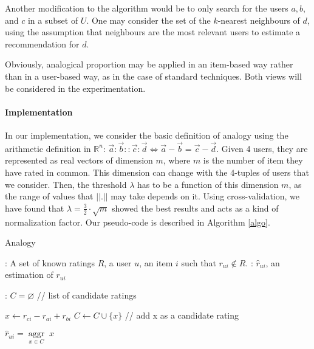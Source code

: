 \documentclass{llncs}
\newcommand{\aggr}[1]{\underset{#1}{\operatorname{aggr}}\;}
\begin{document}
Another modification to the algorithm would be to only search for the users
$a, b,$ and $c$ in a subset of $U$. One may consider the set of the $k$-nearest
neighbours of $d$, using the assumption that neighbours are the most relevant
users to estimate a recommendation for $d$.

Obviously, analogical proportion may be applied in an item-based way rather
than in a user-based way, as in the case of standard techniques. Both views
will be considered in the experimentation.

\paragraph{Implementation\\}
In our implementation, we consider the basic definition of analogy using the
arithmetic definition in $\mathbb{R}^n$: $\vec{a}:\vec{b}::\vec{c}:\vec{d}
\iff \vec{a}-\vec{b}=\vec{c}-\vec{d}$.
Given 4 users, they are represented as real vectors of dimension $m$, where $m$
is the number of item they have rated in common. This dimension can
change with the 4-tuples of users that we consider. 
Then, the threshold $\lambda$ has to be a function of this dimension $m$,
as the range of values that $||.||$ may take depends on it. Using
cross-validation, we have found that $\lambda = \frac{3}{2} \cdot\sqrt{m}$ showed the
best results and acts as a kind of normalization factor.
Our pseudo-code is described in
Algorithm \ref{algo}.
 \begin{algorithm}[!ht]
     \caption{Analogy}
       \label{algo}
       \begin{algorithmic}

      : A set of known ratings $R$, a user $u$, an item
      $i$ such that $r_{ui} \notin R$.
      : $\hat{r}_{ui}$, an estimation of $r_{ui}$

      :
      \STATE $C = \varnothing$ \quad \quad // list of candidate ratings
      
      \STATE  $x \leftarrow r_{ci} - r_{ai} + r_{bi}$
      \STATE $C \gets C \cup \{x\}$ \quad // add x as a candidate rating
	  \ENDFOR

    \STATE $\hat{r}_{ui} = \aggr{x \in C} x$

\end{algorithmic}
\end{algorithm}
\end{document}
